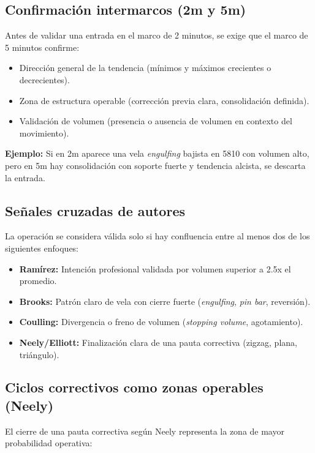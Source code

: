 \subsection*{Confirmaci\'on intermarcos (2m y 5m)}

Antes de validar una entrada en el marco de 2 minutos, se exige que el marco de 5 minutos confirme:

\begin{itemize}
    \item Direcci\'on general de la tendencia (m\'inimos y m\'aximos crecientes o decrecientes).
    \item Zona de estructura operable (correcci\'on previa clara, consolidaci\'on definida).
    \item Validaci\'on de volumen (presencia o ausencia de volumen en contexto del movimiento).
\end{itemize}

\textbf{Ejemplo:} Si en 2m aparece una vela \textit{engulfing} bajista en 5810 con volumen alto, pero en 5m hay consolidaci\'on con soporte fuerte y tendencia alcista, se descarta la entrada.

\subsection*{Se\~nales cruzadas de autores}

La operaci\'on se considera v\'alida solo si hay confluencia entre al menos dos de los siguientes enfoques:

\begin{itemize}
    \item \textbf{Ram\'irez:} Intenci\'on profesional validada por volumen superior a 2.5x el promedio.
    \item \textbf{Brooks:} Patr\'on claro de vela con cierre fuerte (\textit{engulfing}, \textit{pin bar}, reversi\'on).
    \item \textbf{Coulling:} Divergencia o freno de volumen (\textit{stopping volume}, agotamiento).
    \item \textbf{Neely/Elliott:} Finalizaci\'on clara de una pauta correctiva (zigzag, plana, tri\'angulo).
\end{itemize}

\subsection*{Ciclos correctivos como zonas operables (Neely)}

El cierre de una pauta correctiva seg\'un Neely representa la zona de mayor probabilidad operativa:

